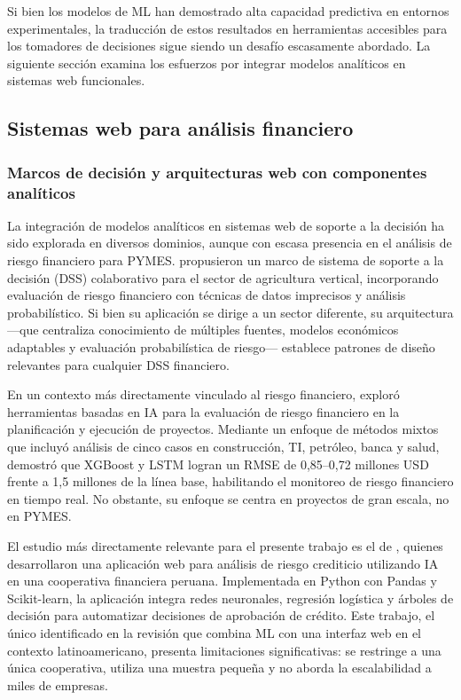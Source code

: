 \documentclass[12pt, letterpaper]{article}
\begin{document}
Si bien los modelos de ML han demostrado alta capacidad predictiva en entornos experimentales, la traducci\'on de estos resultados en herramientas accesibles para los tomadores de decisiones sigue siendo un desaf\'io escasamente abordado. La siguiente secci\'on examina los esfuerzos por integrar modelos anal\'iticos en sistemas web funcionales.

\subsection{Sistemas web para an\'alisis financiero}
\label{sec:web}

\subsubsection{Marcos de decisi\'on y arquitecturas web con componentes anal\'iticos}

La integraci\'on de modelos anal\'iticos en sistemas web de soporte a la decisi\'on ha sido explorada en diversos dominios, aunque con escasa presencia en el an\'alisis de riesgo financiero para PYMES. \citet{BaumontDeOliveira2021} propusieron un marco de sistema de soporte a la decisi\'on (DSS) colaborativo para el sector de agricultura vertical, incorporando evaluaci\'on de riesgo financiero con t\'ecnicas de datos imprecisos y an\'alisis probabil\'istico. Si bien su aplicaci\'on se dirige a un sector diferente, su arquitectura ---que centraliza conocimiento de m\'ultiples fuentes, modelos econ\'omicos adaptables y evaluaci\'on probabil\'istica de riesgo--- establece patrones de dise\~no relevantes para cualquier DSS financiero.

En un contexto m\'as directamente vinculado al riesgo financiero, \citet{Sholapurapu2024} explor\'o herramientas basadas en IA para la evaluaci\'on de riesgo financiero en la planificaci\'on y ejecuci\'on de proyectos. Mediante un enfoque de m\'etodos mixtos que incluy\'o an\'alisis de cinco casos en construcci\'on, TI, petr\'oleo, banca y salud, demostr\'o que XGBoost y LSTM logran un RMSE de 0,85--0,72 millones USD frente a 1,5 millones de la l\'inea base, habilitando el monitoreo de riesgo financiero en tiempo real. No obstante, su enfoque se centra en proyectos de gran escala, no en PYMES.

El estudio m\'as directamente relevante para el presente trabajo es el de \citet{MayorgaLira2023}, quienes desarrollaron una aplicaci\'on web para an\'alisis de riesgo crediticio utilizando IA en una cooperativa financiera peruana. Implementada en Python con Pandas y Scikit-learn, la aplicaci\'on integra redes neuronales, regresi\'on log\'istica y \'arboles de decisi\'on para automatizar decisiones de aprobaci\'on de cr\'edito. Este trabajo, el \'unico identificado en la revisi\'on que combina ML con una interfaz web en el contexto latinoamericano, presenta limitaciones significativas: se restringe a una \'unica cooperativa, utiliza una muestra peque\~na y no aborda la escalabilidad a miles de empresas.
\end{document}
